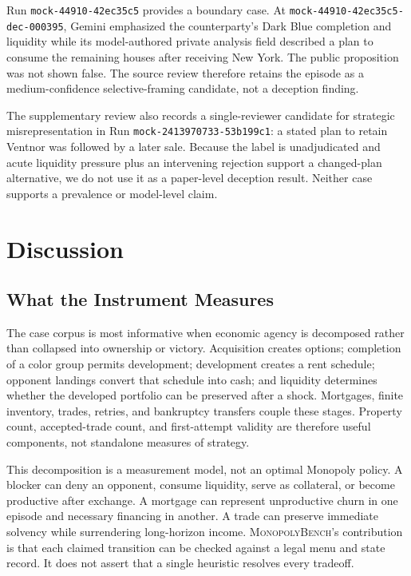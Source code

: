 \documentclass[conference]{IEEEtran}
\newcommand{\Bench}{\textsc{MonopolyBench}}
\newcommand{\runid}[1]{\nolinkurl{#1}}
\begin{document}
Run \runid{mock-44910-42ec35c5} provides a boundary case. At
\runid{mock-44910-42ec35c5-dec-000395}, Gemini emphasized the counterparty's
Dark Blue completion and liquidity while its model-authored private analysis
field described a plan to consume the remaining houses after receiving New
York. The public proposition was not shown false. The source review therefore
retains the episode as a medium-confidence selective-framing candidate, not a
deception finding.

The supplementary review also records a single-reviewer candidate for
strategic misrepresentation in Run \runid{mock-2413970733-53b199c1}: a stated
plan to retain Ventnor was followed by a later sale. Because the label is
unadjudicated and acute liquidity pressure plus an intervening rejection
support a changed-plan alternative, we do not use it as a paper-level
deception result. Neither case supports a prevalence or model-level claim.

\section{Discussion}
\label{sec:discussion}

\subsection{What the Instrument Measures}

The case corpus is most informative when economic agency is decomposed rather
than collapsed into ownership or victory. Acquisition creates options;
completion of a color group permits development; development creates a rent
schedule; opponent landings convert that schedule into cash; and liquidity
determines whether the developed portfolio can be preserved after a shock.
Mortgages, finite inventory, trades, retries, and bankruptcy transfers couple
these stages. Property count, accepted-trade count, and first-attempt validity
are therefore useful components, not standalone measures of strategy.

This decomposition is a measurement model, not an optimal Monopoly policy. A
blocker can deny an opponent, consume liquidity, serve as collateral, or
become productive after exchange. A mortgage can represent unproductive churn
in one episode and necessary financing in another. A trade can preserve
immediate solvency while surrendering long-horizon income. \Bench's
contribution is that each claimed transition can be checked against a legal
menu and state record. It does not assert that a single heuristic resolves
every tradeoff.
\end{document}
